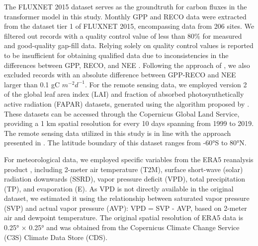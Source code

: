 The FLUXNET 2015 dataset \citep{pastorello2020fluxnet2015} serves as the groundtruth for carbon fluxes in the transformer model in this study. Monthly GPP and RECO data were extracted from the dataset tier 1 of FLUXNET 2015, encompassing data from 206 sites. We filtered out records with a quality control value of less than 80\% for measured and good-quality gap-fill data. Relying solely on quality control values is reported to be insufficient for obtaining qualified data due to inconsistencies in the differences between GPP, RECO, and NEE \citep{zeng2020global, tramontana2016predicting}. Following the approach of \citep{zeng2020global}, we also excluded records with an absolute difference between GPP-RECO and NEE larger than 0.1 gC $m^{-2} d^{-1}$.
For the remote sensing data, we employed version 2 of the global leaf area index (LAI) and fraction of absorbed photosynthetically active radiation (FAPAR) datasets, generated using the algorithm proposed by \citep{verger2014near}. These datasets can be accessed through the Copernicus Global Land Service, providing a 1 km spatial resolution for every 10 days spanning from 1999 to 2019. The remote sensing data utilized in this study is in line with the approach presented in \citep{zeng2020global}. The latitude boundary of this dataset ranges from -60°S to 80°N. \par
{}
For meteorological data, we employed specific variables from the ERA5 reanalysis product \citep{hersbach2020era5}, including 2-meter air temperature (T2M), surface short-wave (solar) radiation downwards (SSRD), vapor pressure deficit (VPD), total precipitation (TP), and evaporation (E). As VPD is not directly available in the original dataset, we estimated it using the relationship between saturated vapor pressure (SVP) and actual vapor pressure (AVP): VPD = SVP - AVP, based on 2-meter air and dewpoint temperature. The original spatial resolution of ERA5 data is 0.25° × 0.25° and was obtained from the Copernicus Climate Change Service (C3S) Climate Data Store (CDS). \par

